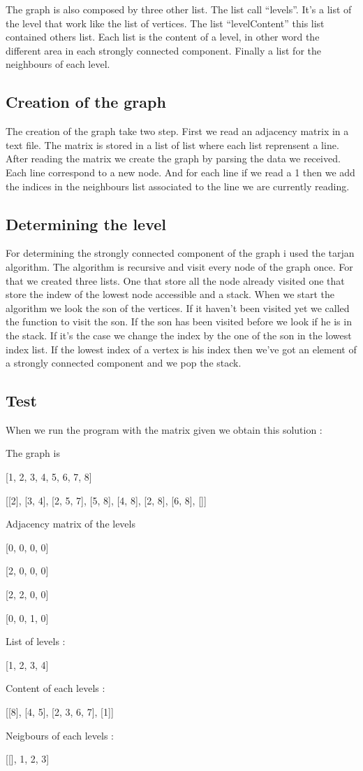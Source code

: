 \documentclass[a4paper,8pt]{article}
\begin{document}
The graph is also composed by three other list. The list call ``levels''. It's a list of the level that work like the list of vertices. The list ``levelContent'' 
this list contained others list. Each list is the content of a level, in other word the different area in each strongly connected component. Finally a list for the 
neighbours of each level.

\subsection{Creation of the graph}
The creation of the graph take two step. First we read an adjacency matrix in a text file.  The matrix is stored in a list of list where each list reprensent a line. 
After reading the matrix we create the graph by parsing the data we received. Each line correspond to a new node. And for each line if we read a 1 then we add the indices 
in the neighbours list associated to the line we are currently reading.

\subsection{Determining the level}
For determining the strongly connected component of the graph i used the tarjan algorithm. The algorithm is recursive and visit every node of the graph once. For
that we created three lists. One that store all the node already visited one that store the indew of the lowest node accessible and a stack. When we start the 
algorithm we look the son of the vertices. If it haven't been visited yet we called the function to visit the son. If the son has been visited before we look if he 
is in the stack. If it's the case we change the index by the one of the son in the lowest index list. If the lowest index of a vertex is his index then we've got an 
element of a strongly connected component and we pop the stack.

\subsection{Test}
When we run the program with the matrix given we obtain this solution :


The graph is

[1, 2, 3, 4, 5, 6, 7, 8]

[[2], [3, 4], [2, 5, 7], [5, 8], [4, 8], [2, 8], [6, 8], []]
 
Adjacency matrix of the levels 

[0, 0, 0, 0]

[2, 0, 0, 0]

[2, 2, 0, 0]

[0, 0, 1, 0]
 
List of levels :

[1, 2, 3, 4]
 
Content of each levels : 

[[8], [4, 5], [2, 3, 6, 7], [1]]
 
Neigbours of each levels :

[[], 1, 2, 3]
\end{document}
